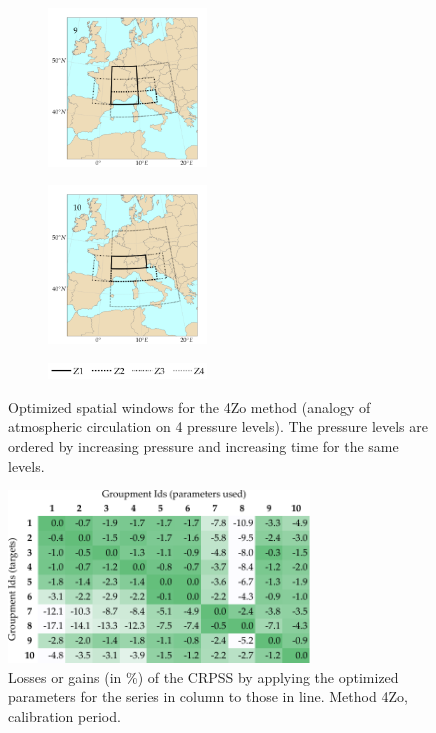 \documentclass[5p]{elsarticle}
\begin{document}
\begin{figure}[htb]
\begin{subfigure}{.5\columnwidth}
	\end{subfigure}
	\begin{subfigure}{.5\columnwidth}
		\centering
		\includegraphics[width=4.2cm]{figures/spatial_win_z4/Spatial_windows_9.png}
	\end{subfigure}%
	\begin{subfigure}{.5\columnwidth}
		\centering
		\includegraphics[width=4.2cm]{figures/spatial_win_z4/Spatial_windows_10.png}
	\end{subfigure}
	\begin{subfigure}{.5\columnwidth}
		\centering
		\includegraphics[width=4.2cm]{figures/spatial_win_z4/legend.png}
	\end{subfigure}
	\caption{Optimized spatial windows for the 4Zo method (analogy of atmospheric circulation on 4 pressure levels). The pressure levels are ordered by increasing pressure and increasing time for the same levels.}
	\label{fig:spatial_windows_4Zo}
\end{figure}

\begin{figure}[htb]
	\centerline{\includegraphics[width=8cm]{figures/table_crossing_z4_calib.pdf}}
	\caption{Losses or gains (in \%) of the CRPSS by applying the optimized parameters for the series in column to those in line. Method 4Zo, calibration period.}
	\label{fig:crossing_4Zo_calib}
\end{figure}
\end{document}

